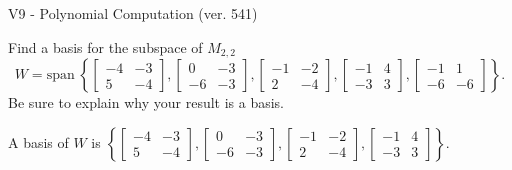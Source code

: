 \begin{exercise}
  \begin{exerciseTitle}V9 - Polynomial Computation (ver. 541)\end{exerciseTitle}
  \begin{exerciseStatement}
    Find a basis for the subspace of \(M_{2,2}\) 
\[W=\mathrm{span}\ \left\{\left[\begin{array}{cc}
-4 & -3 \\
5 & -4
\end{array}\right] , \left[\begin{array}{cc}
0 & -3 \\
-6 & -3
\end{array}\right] , \left[\begin{array}{cc}
-1 & -2 \\
2 & -4
\end{array}\right] , \left[\begin{array}{cc}
-1 & 4 \\
-3 & 3
\end{array}\right] , \left[\begin{array}{cc}
-1 & 1 \\
-6 & -6
\end{array}\right]\right\}.\]
 Be sure to explain why your result is a basis.


  \end{exerciseStatement}
  \begin{exerciseAnswer}
   A basis of \(W\) is  \(\left\{\left[\begin{array}{cc}
-4 & -3 \\
5 & -4
\end{array}\right] , \left[\begin{array}{cc}
0 & -3 \\
-6 & -3
\end{array}\right] , \left[\begin{array}{cc}
-1 & -2 \\
2 & -4
\end{array}\right] , \left[\begin{array}{cc}
-1 & 4 \\
-3 & 3
\end{array}\right]\right\}\).
  


  \end{exerciseAnswer}
\end{exercise}